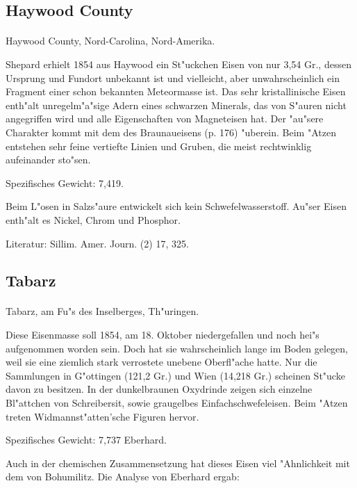 \documentclass[a4paper, 11pt, oneside]{article}
\begin{document}
\subsection{Haywood County}
\normalsize
\paragraph{}
Haywood County, Nord-Carolina, Nord-Amerika.

Shepard erhielt 1854 aus Haywood ein St"uckchen Eisen von nur 3,54 Gr., dessen Ursprung und Fundort unbekannt ist und vielleicht, aber unwahrscheinlich ein Fragment einer schon bekannten Meteormasse ist. Das sehr kristallinische Eisen enth"alt unregelm"a"sige Adern eines schwarzen Minerals, das von S"auren nicht angegriffen wird und alle Eigenschaften von Magneteisen hat. Der "au"sere Charakter kommt mit dem des Braunaueisens (p. 176) "uberein. Beim "Atzen entstehen sehr feine vertiefte Linien und Gruben, die meist rechtwinklig aufeinander sto"sen.

Spezifisches Gewicht: 7,419.

Beim L"osen in Salzs"aure entwickelt sich kein Schwefelwasserstoff. Au"ser Eisen enth"alt es Nickel, Chrom und Phosphor.

Literatur: Sillim. Amer. Journ. (2) 17, 325.

\subsection{Tabarz}
\normalsize
\paragraph{}
Tabarz, am Fu"s des Inselberges, Th"uringen.

Diese Eisenmasse soll 1854, am 18. Oktober niedergefallen und noch hei"s aufgenommen worden sein. Doch hat sie wahrscheinlich lange im Boden gelegen, weil sie eine ziemlich stark verrostete unebene Oberfl"ache hatte. Nur die Sammlungen in G"ottingen (121,2 Gr.) und Wien (14,218 Gr.) scheinen St"ucke davon zu besitzen. In der dunkelbraunen Oxydrinde zeigen sich einzelne Bl"attchen von Schreibersit, sowie graugelbes Einfachschwefeleisen. Beim "Atzen treten Widmannst"atten'sche Figuren hervor.

Spezifisches Gewicht: 7,737 Eberhard.

Auch in der chemischen Zusammensetzung hat dieses Eisen viel "Ahnlichkeit mit dem von Bohumilitz. Die Analyse von Eberhard ergab:
\end{document}

